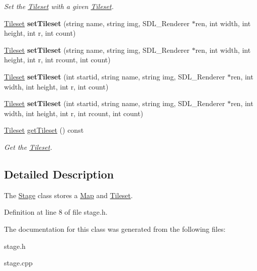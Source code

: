 \begin{DoxyCompactItemize}
\begin{DoxyCompactList}\small\item\em Set the \hyperlink{classTileset}{Tileset} with a given \hyperlink{classTileset}{Tileset}. \end{DoxyCompactList}\item 
\hyperlink{classTileset}{Tileset} {\bfseries set\+Tileset} (string name, string img, S\+D\+L\+\_\+\+Renderer $\ast$ren, int width, int height, int r, int count)\hypertarget{classStage_ab62ad01c46da0337c294c4790020306f}{}\label{classStage_ab62ad01c46da0337c294c4790020306f}

\item 
\hyperlink{classTileset}{Tileset} {\bfseries set\+Tileset} (string name, string img, S\+D\+L\+\_\+\+Renderer $\ast$ren, int width, int height, int r, int rcount, int count)\hypertarget{classStage_a6e71c30197676d98a4a5694ad8b5a733}{}\label{classStage_a6e71c30197676d98a4a5694ad8b5a733}

\item 
\hyperlink{classTileset}{Tileset} {\bfseries set\+Tileset} (int startid, string name, string img, S\+D\+L\+\_\+\+Renderer $\ast$ren, int width, int height, int r, int count)\hypertarget{classStage_ab90d4d0315e6991f2ed8216b6c804339}{}\label{classStage_ab90d4d0315e6991f2ed8216b6c804339}

\item 
\hyperlink{classTileset}{Tileset} {\bfseries set\+Tileset} (int startid, string name, string img, S\+D\+L\+\_\+\+Renderer $\ast$ren, int width, int height, int r, int rcount, int count)\hypertarget{classStage_a42ee2fbdb79971f90984f603fcad54d6}{}\label{classStage_a42ee2fbdb79971f90984f603fcad54d6}

\item 
\hyperlink{classTileset}{Tileset} \hyperlink{classStage_a7c41f0bf5dcdac398169c5a2e92196f3}{get\+Tileset} () const \hypertarget{classStage_a7c41f0bf5dcdac398169c5a2e92196f3}{}\label{classStage_a7c41f0bf5dcdac398169c5a2e92196f3}

\begin{DoxyCompactList}\small\item\em Get the \hyperlink{classTileset}{Tileset}. \end{DoxyCompactList}\end{DoxyCompactItemize}


\subsection{Detailed Description}
The \hyperlink{classStage}{Stage} class stores a \hyperlink{classMap}{Map} and \hyperlink{classTileset}{Tileset}. 

Definition at line 8 of file stage.\+h.



The documentation for this class was generated from the following files\+:\begin{DoxyCompactItemize}
\item 
stage.\+h\item 
stage.\+cpp\end{DoxyCompactItemize}
